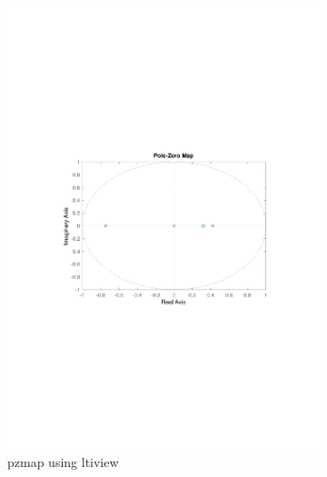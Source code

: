 \documentclass[]{article}
\begin{document}
\begin{figure}[ht]
\centering
\begin{subfigure}{.49\textwidth}
	\centering
	\includegraphics[trim= 10cm 8cm 10cm 8cm, scale=0.4]{figures/1b-pzmap.pdf}
	\caption{pzmap using ltiview}
	\label{fig:1b-pzmap}
\end{subfigure}
\begin{subfigure}{.49\textwidth}
	\centering

\end{subfigure}
\end{figure}
\end{document}
